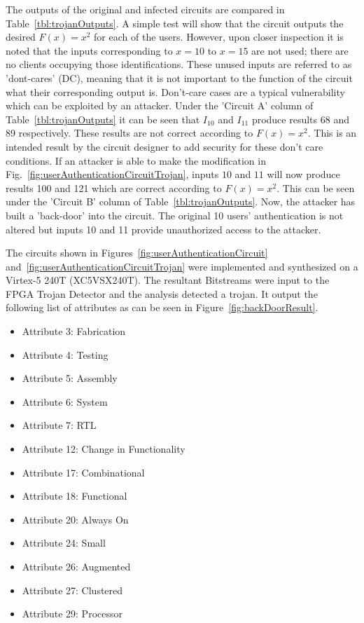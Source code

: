 \documentclass[journal, hidelinks]{IEEEtran}
\begin{document}
The outputs of the original and infected circuits are compared in Table~\ref{tbl:trojanOutputs}.
A simple test will show that the circuit outputs the desired $F(x) = x^2$ for each of the users.
However, upon closer inspection it is noted that the inputs corresponding to $x = 10$ to $x = 15$ are not used; there are no clients occupying those identifications.
These unused inputs are referred to as 'dont-cares' (DC), meaning that it is not important to the function of the circuit what their corresponding output is.
Don't-care cases are a typical vulnerability which can be exploited by an attacker.
Under the 'Circuit A' column of Table~\ref{tbl:trojanOutputs} it can be seen that $I_{10}$ and $I_{11}$ produce results 68 and 89 respectively.
These results are not correct according to $F(x) = x^2$.
This is an intended result by the circuit designer to add security for these don't care conditions.
If an attacker is able to make the modification in Fig.~\ref{fig:userAuthenticationCircuitTrojan}, inputs $10$ and $11$ will now produce results 100 and 121 which are correct according to $F(x) = x^2$.
This can be seen under the 'Circuit B' column of Table~\ref{tbl:trojanOutputs}.
Now, the attacker has built a 'back-door' into the circuit.
The original 10 users' authentication is not altered but inputs 10 and 11 provide unauthorized access to the attacker.

The circuits shown in Figures~\ref{fig:userAuthenticationCircuit} and~\ref{fig:userAuthenticationCircuitTrojan} were implemented and synthesized on a Virtex-5 240T  (XC5VSX240T).
The resultant Bitstreams were input to the FPGA Trojan Detector and the analysis detected a trojan.
It output the following list of attributes as can be seen in Figure~\ref{fig:backDoorResult}.
\begin{itemize}
	\item Attribute 3: Fabrication
	\item Attribute 4: Testing
	\item Attribute 5: Assembly
	\item Attribute 6: System
	\item Attribute 7: RTL
	\item Attribute 12: Change in Functionality
	\item Attribute 17: Combinational
	\item Attribute 18: Functional
	\item Attribute 20: Always On
	\item Attribute 24: Small
	\item Attribute 26: Augmented
	\item Attribute 27: Clustered
	\item Attribute 29: Processor
\end{itemize}
\end{document}
